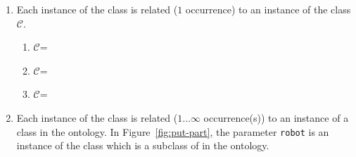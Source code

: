 \begin{enumerate}
  \item Each instance of the class  is related ($1$ occurrence) to an instance of the class $\mathcal{C}$.
    \begin{enumerate}
      \item $\mathcal{C}$=
      \item $\mathcal{C}$=
      \item $\mathcal{C}$=
    \end{enumerate}
  \item Each instance of the class  is related ($1\ldots\infty$ occurrence(s)) to an instance of a class in the  ontology. In Figure~\ref{fig:put-part}, the parameter \texttt{robot} is an instance of the class  which is a subclass of  in the  ontology.


\end{enumerate}
